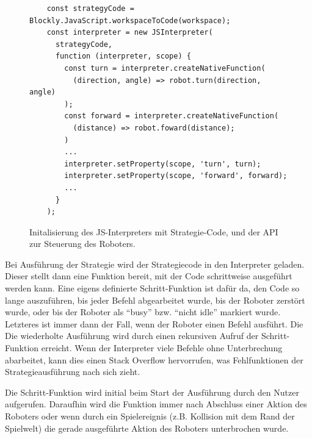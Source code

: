 \begin{figure}
  \begin{lstlisting}
    const strategyCode = Blockly.JavaScript.workspaceToCode(workspace);
    const interpreter = new JSInterpreter(
      strategyCode,
      function (interpreter, scope) {
        const turn = interpreter.createNativeFunction(
          (direction, angle) => robot.turn(direction, angle)
        );
        const forward = interpreter.createNativeFunction(
          (distance) => robot.foward(distance);
        )
        ...
        interpreter.setProperty(scope, 'turn', turn);
        interpreter.setProperty(scope, 'forward', forward);
        ...
      }
    );
  \end{lstlisting}

  \caption{Initalisierung des JS-Interpreters mit Strategie-Code, und der API zur Steuerung des
  Roboters.}

  \label{js-interpreter-init}
\end{figure}

Bei Ausführung der Strategie wird der Strategiecode in den Interpreter geladen. Dieser stellt dann
eine Funktion bereit, mit der Code schrittweise ausgeführt werden kann. Eine eigens definierte
Schritt-Funktion ist dafür da, den Code so lange auszuführen, bis jeder Befehl abgearbeitet wurde,
bis der Roboter zerstört wurde, oder bis der Roboter als \enquote{busy} bzw. \enquote{nicht idle}
markiert wurde. Letzteres ist immer dann der Fall, wenn der Roboter einen Befehl ausführt. Die
Die wiederholte Ausführung wird durch einen rekursiven Aufruf der Schritt-Funktion erreicht. Wenn der
Interpreter viele Befehle ohne Unterbrechung abarbeitet, kann dies einen Stack Overflow hervorrufen,
was Fehlfunktionen der Strategieausführung nach sich zieht.

Die Schritt-Funktion wird initial beim Start der Ausführung durch den Nutzer aufgerufen. Daraufhin
wird die Funktion immer nach Abschluss einer Aktion des Roboters oder wenn durch ein Spielereignis
(z.B. Kollision mit dem Rand der Spielwelt) die gerade ausgeführte Aktion des Roboters unterbrochen
wurde.

